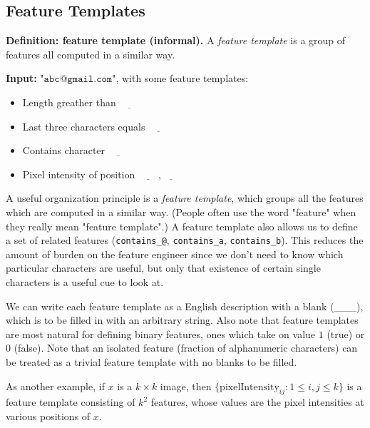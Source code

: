 
\subsection{Feature Templates} %
\label{sub:feature_templates}

\begin{example}
	\textbf{Definition: feature template (informal).} A \textit{feature template} is a group of features all computed in a similar way.
\end{example}
\noindent\textbf{Input:} $\texttt{"abc@gmail.com"}$, with some feature templates:
\begin{itemize}
	\item Length greather than $\underline{\phantom{--}}$
	\item Last three characters equals $\underline{\phantom{--}}$
	\item Contains character $\underline{\phantom{--}}$
	\item Pixel intensity of position $\underline{\phantom{--}}$,$\underline{\phantom{--}}$
\end{itemize}

A useful organization principle is a \textit{feature template},
which groups all the features which are computed in a similar way.
(People often use the word "feature" when they really mean "feature template".)
% 
A feature template also allows us to define a set of related features
(\texttt{contains\_@}, \texttt{contains\_a}, \texttt{contains\_b}).
This reduces the amount of burden on the feature engineer
since we don't need to know which particular characters are useful,
but only that existence of certain single characters is a useful cue to look at.

We can write each feature template as a English description with a blank (\_\_\_),
which is to be filled in with an arbitrary string.
Also note that feature templates are most natural for defining binary features,
ones which take on value $1$ (true) or $0$ (false).
% 
Note that an isolated feature (fraction of alphanumeric characters) can be treated
as a trivial feature template with no blanks to be filled.

As another example, if $x$ is a $k \times k$ image, then $\{ \text{pixelIntensity}_{ij} : 1 \le i,j\le k \}$ is a feature template consisting of $k^2$ features,
whose values are the pixel intensities at various positions of $x$.

